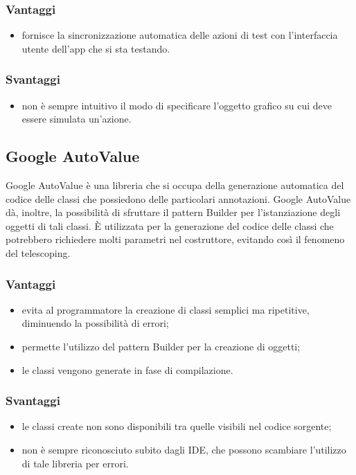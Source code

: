 \documentclass[../Tesi.tex]{subfiles}
\begin{document}
		\subsubsection{Vantaggi}
			\begin{itemize}
				\item fornisce la sincronizzazione automatica delle azioni di test con l'interfaccia utente dell'app che si sta testando.
			\end{itemize}
		\subsubsection{Svantaggi}
			\begin{itemize}
				\item non è sempre intuitivo il modo di specificare l'oggetto grafico su cui deve essere simulata un'azione.
			\end{itemize}
	\subsection{Google AutoValue}
		Google AutoValue è una libreria che si occupa della generazione automatica del codice delle classi che possiedono delle particolari annotazioni. Google AutoValue dà, inoltre, la possibilità di sfruttare il pattern Builder per l'istanziazione degli oggetti di tali classi. È utilizzata per la generazione del codice delle classi che potrebbero richiedere molti parametri nel costruttore, evitando così il fenomeno del telescoping. 
		\subsubsection{Vantaggi}
			\begin{itemize}	
				\item evita al programmatore la creazione di classi semplici ma ripetitive, diminuendo la possibilità di errori;
				\item permette l'utilizzo del pattern Builder per la creazione di oggetti;
				\item le classi vengono generate in fase di compilazione.
			\end{itemize}
		\subsubsection{Svantaggi}
			\begin{itemize}
				\item le classi create non sono disponibili tra quelle visibili nel codice sorgente;
				\item non è sempre riconosciuto subito dagli IDE, che possono scambiare l'utilizzo di tale libreria per errori.
			\end{itemize}
\end{document}
